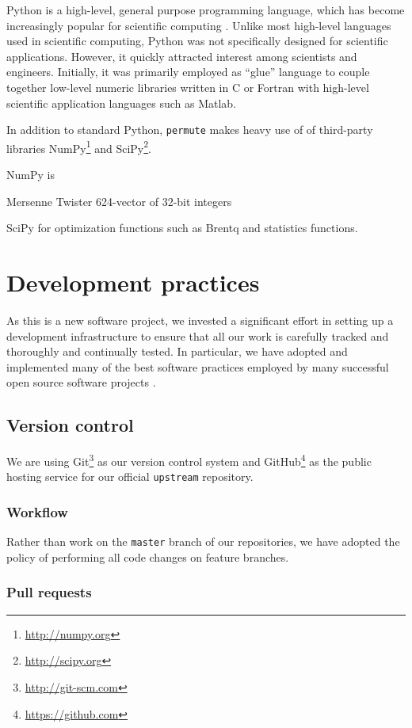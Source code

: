 Python is a high-level, general purpose programming language, which has
become increasingly popular for scientific computing
\cite{millman2011python, Perez2011}. Unlike most high-level languages
used in scientific computing, Python was not specifically designed for
scientific applications.  However, it quickly attracted interest among
scientists and engineers.  Initially, it was primarily employed as ``glue''
language to couple together low-level numeric libraries written in C or
Fortran with high-level scientific application languages such as Matlab.

In addition to standard Python, \texttt{permute} makes heavy use of
of third-party libraries NumPy\footnote{\url{http://numpy.org}} and
SciPy\footnote{\url{http://scipy.org}}.

NumPy is

Mersenne Twister
624-vector of 32-bit integers

SciPy
for optimization functions such as Brentq and statistics functions.


\section{Development practices}

As this is a new software project, we invested a significant effort in
setting up a development infrastructure to ensure that all our work
is carefully tracked and thoroughly and continually tested.  In particular,
we have adopted and implemented many of the best software practices
employed by many successful open source software projects \cite{millman2014}.

\subsection{Version control}

We are using Git\footnote{\url{http://git-scm.com}} as our version control
system and GitHub\footnote{\url{https://github.com}} as the public hosting
service for our official \texttt{upstream} repository.

\subsubsection{Workflow}

Rather than work on the \texttt{master} branch of our repositories,
we have adopted the policy of performing all code changes on
feature branches.

\subsubsection{Pull requests}

